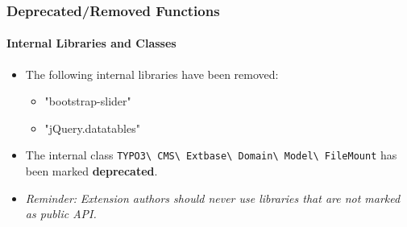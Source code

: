 \begin{frame}[fragile]
	\frametitle{Deprecated/Removed Functions}
	\framesubtitle{Internal Libraries and Classes}

	\begin{itemize}
		\item The following internal libraries have been removed:
			\begin{itemize}
				\item "bootstrap-slider"
				\item "jQuery.datatables"
			\end{itemize}
			\vspace{0.4cm}

		\item The internal class \small\texttt{TYPO3\textbackslash
			CMS\textbackslash
			Extbase\textbackslash
			Domain\textbackslash
			Model\textbackslash
			FileMount}\normalsize\newline
			has been marked \textbf{deprecated}.

	\end{itemize}

	\vspace{0.6cm}
	\begin{itemize}
		\item[\ding{228}] \textit{Reminder:} \textit{Extension authors should never use libraries that are not marked as public API.}
	\end{itemize}

\end{frame}


